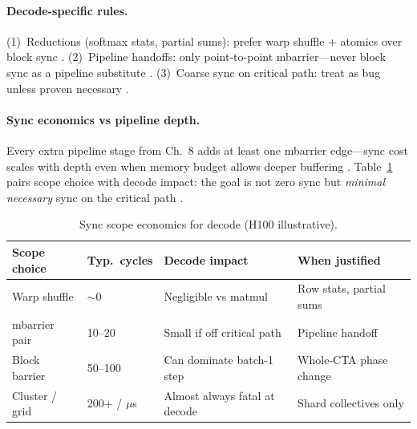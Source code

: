 \paragraph{Decode-specific rules.}
(1)~Reductions (softmax stats, partial sums): prefer warp shuffle + atomics over block sync \citep{dao2022flashattention,shah2024flashattention3}.
(2)~Pipeline handoffs: only point-to-point mbarrier---never block sync as a pipeline substitute \citep{semianalysis2024tma,yirage2026}.
(3)~Coarse sync on critical path: treat as bug unless proven necessary \citep{taxbreak2026,patel2025llminference,memoryfloor2026}.

\paragraph{Sync economics vs pipeline depth.}
Every extra pipeline stage from Ch.~8 adds at least one mbarrier edge---sync cost scales with depth even when memory budget allows deeper buffering \citep{semianalysis2024tma,yirage2026}.
Table~\ref{tab:ch09_sync_economics} pairs scope choice with decode impact: the goal is not zero sync but \emph{minimal necessary} sync on the critical path \citep{shah2024flashattention3,patel2025llminference}.

\begin{table}[t]
\centering
\small
\caption{Sync scope economics for decode (H100 illustrative).}
\label{tab:ch09_sync_economics}
\begin{tabular}{@{}p{2.0cm}p{2.4cm}p{2.4cm}p{2.4cm}@{}}
\toprule
\textbf{Scope choice} & \textbf{Typ.\ cycles} & \textbf{Decode impact} & \textbf{When justified} \\
\midrule
Warp shuffle & ${\sim}$0 & Negligible vs matmul & Row stats, partial sums \\
mbarrier pair & 10--20 & Small if off critical path & Pipeline handoff \\
Block barrier & 50--100 & Can dominate batch-1 step & Whole-CTA phase change \\
Cluster / grid & 200+ / $\mu$s & Almost always fatal at decode & Shard collectives only \\
\bottomrule
\end{tabular}
\end{table}

